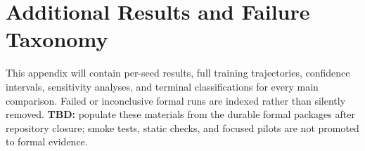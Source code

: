 \section{Additional Results and Failure Taxonomy}
\label{app:results}

This appendix will contain per-seed results, full training trajectories, confidence intervals, sensitivity analyses, and terminal classifications for every main comparison. Failed or inconclusive formal runs are indexed rather than silently removed. \textbf{TBD:} populate these materials from the durable formal packages after repository closure; smoke tests, static checks, and focused pilots are not promoted to formal evidence.

